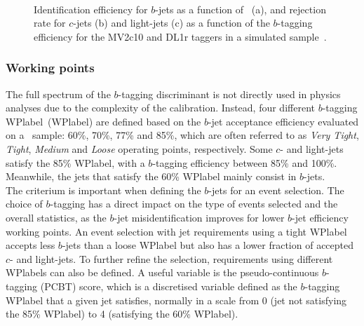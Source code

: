 \begin{figure}[htbp]
    \RawFloats
    \begin{center}
         \\
        \quad
        \caption{
        Identification efficiency for $b$-jets as a function of \pT\ (a), and rejection rate for $c$-jets (b) and light-jets (c) as a function of the $b$-tagging efficiency for the MV2c10 and DL1r taggers in a simulated \ttbar sample~\cite{taggingeff}.
    }
    \label{figEVNTRECO:taggingeff}
    \end{center}
\end{figure}

\subsubsection{Working points}

The full spectrum of the $b$-tagging discriminant is not directly used in physics analyses due to the complexity of the calibration. Instead, four different $b$-tagging \acrlong{WPlabel}~(\acrshort{WPlabel}) are defined based on the $b$-jet acceptance efficiency evaluated on a \ttbar\ sample: 60\%, 70\%, 77\% and 85\%, which are often referred to as \textit{Very Tight}, \textit{Tight}, \textit{Medium} and \textit{Loose} operating points, respectively. Some $c$- and light-jets satisfy the 85\% \acrshort{WPlabel}, with a $b$-tagging efficiency between 85\% and 100\%. Meanwhile, the jets that satisfy the 60\% \acrshort{WPlabel} mainly consist in $b$-jets.\\

The criterium is important when defining the $b$-jets for an event selection. The choice of $b$-tagging has a direct impact on the type of events selected and the overall statistics, as the $b$-jet misidentification improves for lower $b$-jet efficiency working points. An event selection with jet requirements using a tight \acrshort{WPlabel} accepts less $b$-jets than a loose \acrshort{WPlabel} but also has a lower fraction of accepted $c$- and light-jets. To further refine the selection, requirements using different \acrshort{WPlabel}s can also be defined. A useful variable is the pseudo-continuous $b$-tagging (PCBT) score, which is a discretised variable defined as the $b$-tagging \acrshort{WPlabel} that a given jet satisfies, normally in a scale from 0 (jet not satisfying the 85\% \acrshort{WPlabel}) to 4 (satisfying the 60\% \acrshort{WPlabel}).

